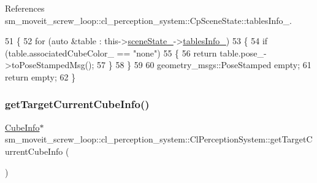 References sm\+\_\+moveit\+\_\+screw\+\_\+loop\+::cl\+\_\+perception\+\_\+system\+::\+Cp\+Scene\+State\+::tables\+Info\+\_\+.


\begin{DoxyCode}
51             \{
52                 \textcolor{keywordflow}{for} (\textcolor{keyword}{auto} &table : this->\hyperlink{classsm__moveit__screw__loop_1_1cl__perception__system_1_1ClPerceptionSystem_abb08b3cc6d4ec414a608da92133b1f66}{sceneState\_}->\hyperlink{classsm__moveit__screw__loop_1_1cl__perception__system_1_1CpSceneState_a13c7fd5645885ad697cedb48edbb3f09}{tablesInfo\_})
53                 \{
54                     \textcolor{keywordflow}{if} (table.associatedCubeColor\_ == \textcolor{stringliteral}{"none"})
55                     \{
56                         \textcolor{keywordflow}{return} table.pose\_->toPoseStampedMsg();
57                     \}
58                 \}
59 
60                 geometry\_msgs::PoseStamped empty;
61                 \textcolor{keywordflow}{return} empty;
62             \}
\end{DoxyCode}
\mbox{\label{classsm__moveit__screw__loop_1_1cl__perception__system_1_1ClPerceptionSystem_ad9231b87b9592cc5c847ce1b92a75446}} 
\subsubsection{\texorpdfstring{get\+Target\+Current\+Cube\+Info()}{getTargetCurrentCubeInfo()}}
{\footnotesize\ttfamily \hyperlink{structsm__moveit__screw__loop_1_1cl__perception__system_1_1CubeInfo}{Cube\+Info}$\ast$ sm\+\_\+moveit\+\_\+screw\+\_\+loop\+::cl\+\_\+perception\+\_\+system\+::\+Cl\+Perception\+System\+::get\+Target\+Current\+Cube\+Info (\begin{DoxyParamCaption}{ }\end{DoxyParamCaption})\hspace{0.3cm}{\ttfamily [inline]}}




